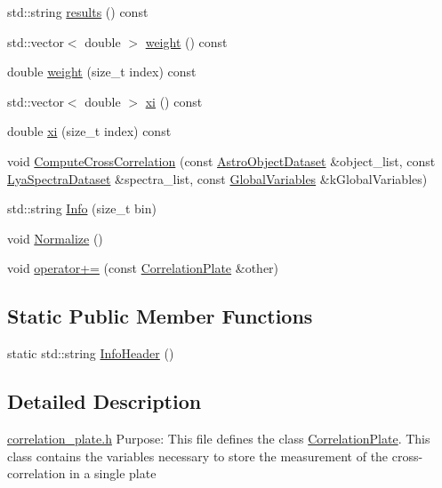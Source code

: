 \begin{DoxyCompactItemize}
\item 
std\-::string \hyperlink{class_correlation_plate_a9af909d0d17ea8942c17b41e9379743c}{results} () const 
\item 
std\-::vector$<$ double $>$ \hyperlink{class_correlation_plate_a32f5eecab20e5e16c0782c8ba1769ea5}{weight} () const 
\item 
double \hyperlink{class_correlation_plate_a42507a70df5dd9f258ea626df83c578c}{weight} (size\-\_\-t index) const 
\item 
std\-::vector$<$ double $>$ \hyperlink{class_correlation_plate_ab3c49e88f49bb59fc6ee7f40c4b4fb66}{xi} () const 
\item 
double \hyperlink{class_correlation_plate_aa32ca0acce6b0562802f12400df1d13b}{xi} (size\-\_\-t index) const 
\item 
void \hyperlink{class_correlation_plate_a5a7760172439f8103abe425376d8415c}{Compute\-Cross\-Correlation} (const \hyperlink{class_astro_object_dataset}{Astro\-Object\-Dataset} \&object\-\_\-list, const \hyperlink{class_lya_spectra_dataset}{Lya\-Spectra\-Dataset} \&spectra\-\_\-list, const \hyperlink{class_global_variables}{Global\-Variables} \&k\-Global\-Variables)
\item 
std\-::string \hyperlink{class_correlation_plate_a3a6bfbe0c65cc4bb46ce4b4b43dc8d4e}{Info} (size\-\_\-t bin)
\item 
void \hyperlink{class_correlation_plate_a6e26de4b826cfd2b96d9d2d510f1e8e5}{Normalize} ()
\item 
void \hyperlink{class_correlation_plate_ac1d606757bd81c92e7c88387c59f5a1d}{operator+=} (const \hyperlink{class_correlation_plate}{Correlation\-Plate} \&other)
\end{DoxyCompactItemize}
\subsection*{Static Public Member Functions}
\begin{DoxyCompactItemize}
\item 
static std\-::string \hyperlink{class_correlation_plate_acefd722604a86e782cc773f80ef30bc9}{Info\-Header} ()
\end{DoxyCompactItemize}


\subsection{Detailed Description}
\hyperlink{correlation__plate_8h}{correlation\-\_\-plate.\-h} Purpose\-: This file defines the class \hyperlink{class_correlation_plate}{Correlation\-Plate}. This class contains the variables necessary to store the measurement of the cross-\/correlation in a single plate

